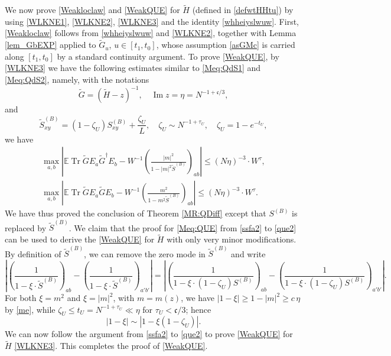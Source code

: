 \documentclass[10pt,reqno]{article}
\DeclareMathOperator{\im}{{\mathrm{Im}}}
\DeclareMathOperator{\tr}{Tr}
\theoremstyle{plain} %
\theoremstyle{remark}
\numberwithin{equation}{section}
\begin{document}
We now prove  \eqref{Weakloclaw} and  \eqref{WeakQUE} for $\widetilde{H}$ (defined in \eqref{defwtHHtu}) by using  \eqref{WLKNE1}, \eqref{WLKNE2}, \eqref{WLKNE3} and the identity \eqref{whheiyslwuw}. First, \eqref{Weakloclaw} follows from \eqref{whheiyslwuw} and \eqref{WLKNE2}, together with Lemma \ref{lem_GbEXP} applied to $\widetilde G_u$, $u\in[t_1,t_0]$, whose assumption \eqref{asGMc} is carried along $[t_1,t_0]$ by a standard continuity argument. To prove \eqref{WeakQUE},  by  \eqref{WLKNE3}  we have  the following estimates similar to  \eqref{Meq:QdS1} and \eqref{Meq:QdS2}, namely, with the notations 
$$\widetilde{G}=(\widetilde{H}-z)^{-1},\quad  \im z=\eta=N^{-1+\mathfrak c/ 3}, 
$$ 
and 
 \[
  \widetilde{S}^{(B)}_{xy}  = (1-\zeta_U) S^{(B)}_{xy} + \frac{\zeta_U}{L}, \quad \zeta_U \sim  N^{-1+\tau_U}, \quad \zeta_U=1-e^{-t_U}, 
\]
 we have 
  \begin{align} 
 \max_{a,b }   \left|\mathbb E\tr \widetilde{G} E_a \widetilde{G}^\dagger E_b- W^{-1}\left(\frac{|m|^2}{1-|m|^2 \widetilde{S}^{(B)}} \right)_{ab}\right|\le  \left(N\eta \right)^{-3} \cdot W^\tau,   \\
 \nonumber
 \max_{a,b }   \left|\mathbb E\tr \widetilde{G} E_a \widetilde{G}  E_b- W^{-1}\left(\frac{m^2}{1-m^2 \widetilde{S}^{(B)}} \right)_{ab}\right|\le \left(N\eta \right)^{-3} \cdot W^\tau   .
\end{align}
We have thus proved the  conclusion of Theorem \ref{MR:QDiff} except that $S^{(B)}$ is replaced by $\widetilde{S}^{(B)}$.  We claim that  the proof for \eqref{Meq:QUE} 
from \eqref{ssfa2} to \eqref{que2} can be used 
to derive the   \eqref{WeakQUE} for $\widetilde{H}$ with only very minor modifications.
By definition of $\widetilde{S}^{(B)}$, we can remove the zero mode in $\widetilde{S}^{(B)}$ and write
  $$\left| \left(\frac{1}{1-\xi\cdot \widetilde{S}^{(B)}}\right)_{ab}-\left(\frac{1}{1-\xi\cdot \widetilde{S}^{(B)}}\right)_{a'b'}\right|
 =
 \left| \left(\frac{1}{1-\xi\cdot  (1-\zeta_U){S}^{(B)}}\right)_{ab}-\left(\frac{1}{1-\xi\cdot  (1-\zeta_U){S}^{(B)}}\right)_{a'b'}\right|.
 $$
For both $\xi=m^2$ and $\xi=|m|^2$, with $m=m(z)$, we have $|1-\xi|\ge 1-|m|^2\ge c\,\eta$ by \eqref{me}, while $\zeta_U\le t_U=N^{-1+\tau_U}\ll \eta$ for $\tau_U<\mathfrak c/3$; hence
$$
|1-\xi |\sim |1-\xi (1-\zeta_U)|.
$$
We can now follow the argument from \eqref{ssfa2} to \eqref{que2} to prove 
\eqref{WeakQUE} for $\widetilde{H}$ \eqref{WLKNE3}. This completes the proof of \eqref{WeakQUE}. 
 
\end{document}
